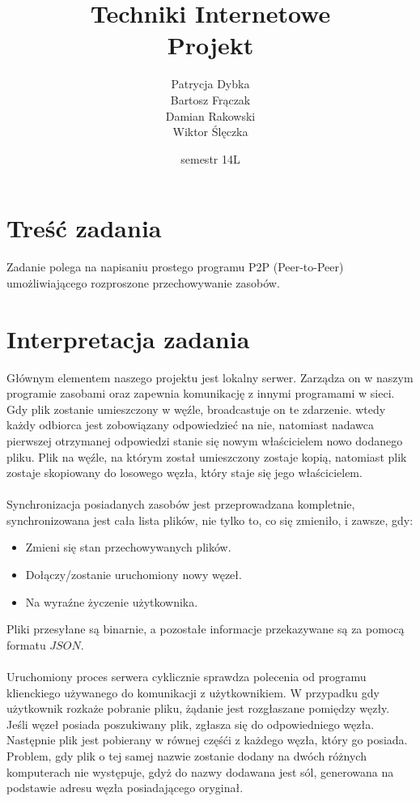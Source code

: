 \documentclass[10pt,a4paper]{article}
\title{Techniki Internetowe\\
       \textbf{Projekt}}
\date{semestr 14L}
\author{Patrycja Dybka\\
		Bartosz Frączak\\
		Damian Rakowski\\
		Wiktor Ślęczka}
\begin{document}
\maketitle
\newpage

\tableofcontents
\newpage

\section{Treść zadania}
Zadanie polega na napisaniu prostego programu P2P (Peer-to-Peer) umożliwiającego rozproszone przechowywanie zasobów.
\section{Interpretacja zadania}
Głównym elementem naszego projektu jest lokalny serwer. Zarządza on w naszym programie zasobami oraz zapewnia komunikację z innymi programami w sieci. Gdy plik zostanie umieszczony w węźle, broadcastuje on te zdarzenie. wtedy każdy odbiorca jest zobowiązany odpowiedzieć na nie, natomiast nadawca pierwszej otrzymanej odpowiedzi stanie się nowym właścicielem nowo dodanego pliku. Plik na węźle, na którym został umieszczony zostaje kopią, natomiast plik zostaje skopiowany do losowego węzła, który staje się jego właścicielem.\\
\\
Synchronizacja posiadanych zasobów jest przeprowadzana kompletnie, synchronizowana jest cała lista plików, nie tylko to, co się zmieniło, i zawsze, gdy:
\begin{itemize}
\item Zmieni się stan przechowywanych plików.
\item Dołączy/zostanie uruchomiony nowy węzeł.
\item Na wyraźne życzenie użytkownika.
\end{itemize}

Pliki przesyłane są binarnie, a pozostałe informacje przekazywane są za pomocą formatu $JSON$.\\
\\Uruchomiony proces serwera cyklicznie sprawdza polecenia od programu klienckiego używanego do komunikacji z użytkownikiem. W przypadku gdy użytkownik rozkaże pobranie pliku, żądanie jest rozgłaszane pomiędzy węzły. Jeśli węzeł posiada poszukiwany plik, zgłasza się do odpowiedniego węzła. Następnie plik jest pobierany w równej częśći z każdego węzła, który go posiada. Problem, gdy plik o tej samej nazwie zostanie dodany na dwóch różnych komputerach nie występuje, gdyż do nazwy dodawana jest sól, generowana na podstawie adresu węzła posiadającego oryginał.\\
\end{document}

